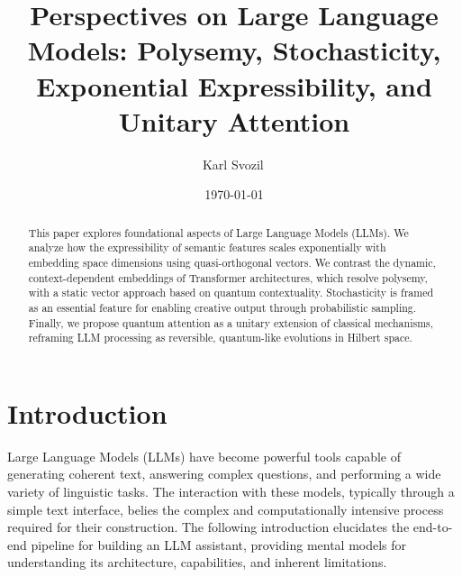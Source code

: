 \documentclass[%
  reprint,
  superscriptaddress,
  showpacs,
  showkeys,
  amsmath,amssymb,
  pra,
  longbibliography,
  floatfix,
  x11names
]{revtex4-2}
\begin{document}
\title{Perspectives on Large Language Models: Polysemy, Stochasticity, Exponential Expressibility, and Unitary Attention}

\author{Karl Svozil\,}

\date{\today}

\begin{abstract}
This paper explores foundational aspects of Large Language Models (LLMs). We analyze how the expressibility of semantic features scales exponentially with embedding space dimensions using quasi-orthogonal vectors. We contrast the dynamic, context-dependent embeddings of Transformer architectures, which resolve polysemy, with a static vector approach based on quantum contextuality. Stochasticity is framed as an essential feature for enabling creative output through probabilistic sampling. Finally, we propose quantum attention as a unitary extension of classical mechanisms, reframing LLM processing as reversible, quantum-like evolutions in Hilbert space.
\end{abstract}


\maketitle

\section{Introduction}

Large Language Models (LLMs) have become powerful tools capable of generating coherent text, answering complex questions, and performing a wide variety of linguistic tasks. The interaction with these models, typically through a simple text interface, belies the complex and computationally intensive process required for their construction.
The following introduction elucidates the end-to-end pipeline for building an LLM assistant, providing mental models for understanding its architecture, capabilities, and inherent limitations.
\end{document}
